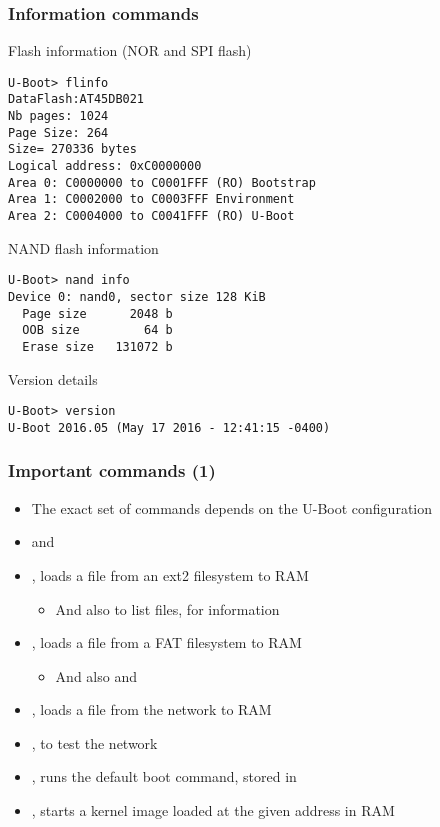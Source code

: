 \begin{frame}[fragile]
  \frametitle{Information commands}

\begin{block}{Flash information (NOR and SPI flash)}
{\tiny
\begin{verbatim}
U-Boot> flinfo
DataFlash:AT45DB021
Nb pages: 1024
Page Size: 264
Size= 270336 bytes
Logical address: 0xC0000000
Area 0: C0000000 to C0001FFF (RO) Bootstrap
Area 1: C0002000 to C0003FFF Environment
Area 2: C0004000 to C0041FFF (RO) U-Boot
\end{verbatim}}
\end{block}

\begin{block}{NAND flash information}
{\tiny
\begin{verbatim}
U-Boot> nand info
Device 0: nand0, sector size 128 KiB
  Page size      2048 b
  OOB size         64 b
  Erase size   131072 b
\end{verbatim}}
\end{block}

\begin{block}{Version details}
{\tiny
\begin{verbatim}
U-Boot> version
U-Boot 2016.05 (May 17 2016 - 12:41:15 -0400)
\end{verbatim}}
\end{block}

\end{frame}

\begin{frame}
  \frametitle{Important commands (1)}
  \begin{itemize}
  \item The exact set of commands depends on the U-Boot configuration
  \item {} and 
  \item {}, loads a file from an ext2 filesystem to RAM
    \begin{itemize}
    \item And also  to list files,  for
      information
    \end{itemize}
  \item {}, loads a file from a FAT filesystem to RAM
    \begin{itemize}
    \item And also  and 
    \end{itemize}
  \item {}, loads a file from the network to RAM
  \item {}, to test the network
  \item {}, runs the default boot command, stored in
  \item {}, starts a kernel image loaded at the
    given address in RAM
  \end{itemize}
\end{frame}

